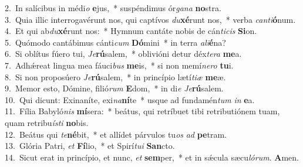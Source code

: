 {2.~}In salícibus in médi\textit{o} \textbf{e}jus,~* suspéndimus ór\textit{ga}\textit{na} \textbf{no}stra.\\
{3.~}Quia illic interrogavérunt nos, qui captívos \textit{du}\textbf{xé}runt nos,~* verba \textit{can}\textit{ti}\textbf{ó}num.\\
{4.~}Et qui ab\textit{du}\textbf{xé}runt nos:~* Hymnum cantáte nobis de cán\textit{ti}\textit{cis} \textbf{Si}on.\\
{5.~}Quómodo cantábimus cánti\textit{cum} \textbf{Dó}mini~* in terra \textit{a}\textit{li}\textbf{é}na?\\
{6.~}Si oblítus fúero tui, \textit{Je}\textbf{rú}salem,~* oblivióni detur déx\textit{te}\textit{ra} \textbf{me}a.\\
{7.~}Adhǽreat lingua mea fáuci\textit{bus} \textbf{me}is,~* si non memí\textit{ne}\textit{ro} \textbf{tu}i.\\
{8.~}Si non proposúero \textit{Je}\textbf{rú}salem,~* in princípio lætí\textit{ti}\textit{æ} \textbf{me}æ.\\
{9.~}Memor esto, Dómine, filió\textit{rum} \textbf{E}dom,~* in di\textit{e} \textit{Je}\textbf{rú}salem.\\
{10.~}Qui dicunt: Exinaníte, exi\textit{na}\textbf{ní}te~* usque ad fundamén\textit{tum} \textit{in} \textbf{e}a.\\
{11.~}Fília Babyló\textit{nis} \textbf{mí}sera:~* beátus, qui retríbuet tibi retributiónem tuam, quam retribu\textit{í}\textit{sti} \textbf{no}bis.\\
{12.~}Beátus qui \textit{te}\textbf{né}bit,~* et allídet párvulos tu\textit{os} \textit{ad} \textbf{pe}tram.\\
{13.~}Glória Patri, \textit{et} \textbf{Fí}lio,~* et Spirí\textit{tu}\textit{i} \textbf{San}cto.\\
{14.~}Sicut erat in princípio, et nunc, \textit{et} \textbf{sem}per,~* et in sǽcula sæcu\textit{ló}\textit{rum}. \textbf{A}men.\\

